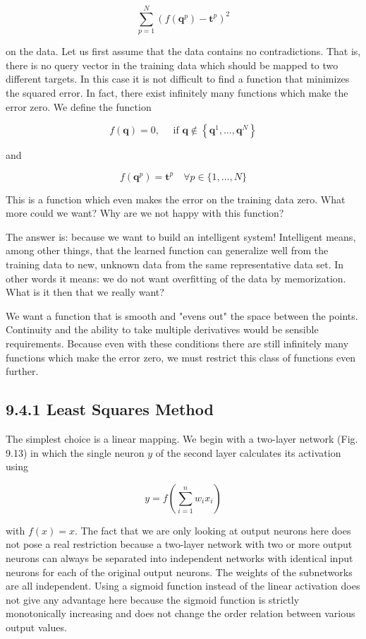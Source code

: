 \documentclass[10pt]{article}
\begin{document}
$$
\sum_{p=1}^{N}\left(f\left(\boldsymbol{q}^{p}\right)-\boldsymbol{t}^{p}\right)^{2}
$$

on the data. Let us first assume that the data contains no contradictions. That is, there is no query vector in the training data which should be mapped to two different targets. In this case it is not difficult to find a function that minimizes the squared error. In fact, there exist infinitely many functions which make the error zero. We define the function

$$
f(\boldsymbol{q})=0, \quad \text { if } \boldsymbol{q} \notin\left\{\boldsymbol{q}^{1}, \ldots, \boldsymbol{q}^{N}\right\}
$$

and

$$
f\left(\boldsymbol{q}^{p}\right)=\boldsymbol{t}^{p} \quad \forall p \in\{1, \ldots, N\}
$$

This is a function which even makes the error on the training data zero. What more could we want? Why are we not happy with this function?

The answer is: because we want to build an intelligent system! Intelligent means, among other things, that the learned function can generalize well from the training data to new, unknown data from the same representative data set. In other words it means: we do not want overfitting of the data by memorization. What is it then that we really want?

We want a function that is smooth and "evens out" the space between the points. Continuity and the ability to take multiple derivatives would be sensible requirements. Because even with these conditions there are still infinitely many functions which make the error zero, we must restrict this class of functions even further.

\subsection*{9.4.1 Least Squares Method}
The simplest choice is a linear mapping. We begin with a two-layer network (Fig. 9.13) in which the single neuron $y$ of the second layer calculates its activation using


$$
y=f\left(\sum_{i=1}^{n} w_{i} x_{i}\right)
$$

with $f(x)=x$. The fact that we are only looking at output neurons here does not pose a real restriction because a two-layer network with two or more output neurons can always be separated into independent networks with identical input neurons for each of the original output neurons. The weights of the subnetworks are all independent. Using a sigmoid function instead of the linear activation does not give any advantage here because the sigmoid function is strictly monotonically increasing and does not change the order relation between various output values.
\end{document}
